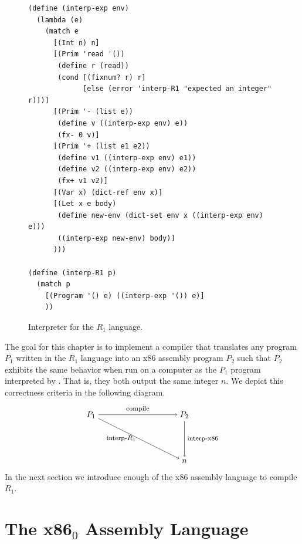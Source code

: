 \documentclass[11pt]{book}
\begin{document}
\begin{figure}[tp]
\begin{lstlisting}
(define (interp-exp env)
  (lambda (e)
    (match e
      [(Int n) n]
      [(Prim 'read '())
       (define r (read))
       (cond [(fixnum? r) r]
             [else (error 'interp-R1 "expected an integer" r)])]
      [(Prim '- (list e))
       (define v ((interp-exp env) e))
       (fx- 0 v)]
      [(Prim '+ (list e1 e2))
       (define v1 ((interp-exp env) e1))
       (define v2 ((interp-exp env) e2))
       (fx+ v1 v2)]
      [(Var x) (dict-ref env x)]
      [(Let x e body)
       (define new-env (dict-set env x ((interp-exp env) e)))
       ((interp-exp new-env) body)]
      )))

(define (interp-R1 p)
  (match p
    [(Program '() e) ((interp-exp '()) e)]
    ))
\end{lstlisting}
\caption{Interpreter for the $R_1$ language.}
\label{fig:interp-R1}
\end{figure}

The goal for this chapter is to implement a compiler that translates
any program $P_1$ written in the $R_1$ language into an x86 assembly
program $P_2$ such that $P_2$ exhibits the same behavior when run on a
computer as the $P_1$ program interpreted by .  That
is, they both output the same integer $n$. We depict this correctness
criteria in the following diagram.
\[
\begin{tikzpicture}[baseline=(current  bounding  box.center)]
 \node (p1) at (0,  0)   {$P_1$};
 \node (p2) at (4,  0)   {$P_2$};
 \node (o)  at (4, -2) {$n$};

 \path[->] (p1) edge [above] node {\footnotesize compile} (p2);
 \path[->] (p1) edge [left]  node {\footnotesize interp-$R_1$} (o);
 \path[->] (p2) edge [right] node {\footnotesize interp-x86} (o);
\end{tikzpicture}
\]
In the next section we introduce enough of the x86 assembly
language to compile $R_1$.

\section{The x86$_0$ Assembly Language}
\label{sec:x86}
\end{document}
